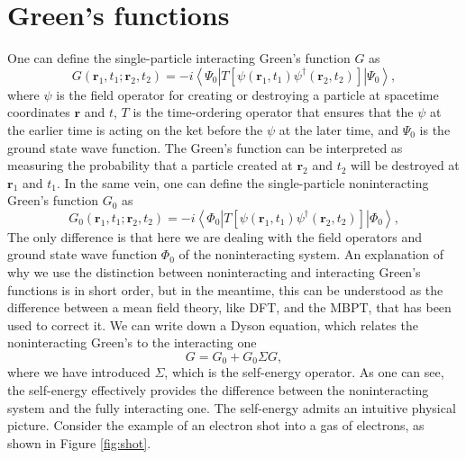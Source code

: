 \documentclass[12pt]{article}
\begin{document}
\section{Green's functions}
One can define the single-particle interacting Green's function $G$ as
\begin{equation}
G\left(\mathbf{r}_1, t_1 ; \mathbf{r}_2, t_2\right)=-i\left\langle\Psi_0\left|T\left[\psi\left(\mathbf{r}_1, t_1\right) \psi^{\dagger}\left(\mathbf{r}_2, t_2\right)\right]\right| \Psi_0\right\rangle,
\end{equation}
where $\psi$ is the field operator for creating or destroying a particle at spacetime coordinates $\mathbf{r}$ and $t$, $T$ is the time-ordering operator that ensures that the $\psi$ at the earlier time is acting on the ket before the $\psi$ at the later time, and $\Psi_0$ is the ground state wave function. The Green's function can be interpreted as measuring the probability that a particle created at $\mathbf{r}_2$ and $t_2$ will be destroyed at $\mathbf{r}_1$ and $t_1$. In the same vein, one can define the single-particle noninteracting Green's function $G_0$ as
\begin{equation}
G_0\left(\mathbf{r}_1, t_1 ; \mathbf{r}_2, t_2\right)=-i\left\langle\Phi_0\left|T\left[\psi\left(\mathbf{r}_1, t_1\right) \psi^{\dagger}\left(\mathbf{r}_2, t_2\right)\right]\right| \Phi_0\right\rangle,
\end{equation}
The only difference is that here we are dealing with the field operators and ground state wave function $\Phi_0$ of the noninteracting system. An explanation of why we use the distinction between noninteracting and interacting Green's functions is in short order, but in the meantime, this can be understood as the difference between a mean field theory, like DFT, and the MBPT, that has been used to correct it. We can write down a Dyson equation, which relates the noninteracting Green's to the interacting one
\begin{equation}
G=G_0+G_0\Sigma G,
\label{eq:dyson}
\end{equation}
where we have introduced $\Sigma$, which is the self-energy operator. As one can see, the self-energy effectively provides the difference between the noninteracting system and the fully interacting one. The self-energy admits an intuitive physical picture. Consider the example of an electron shot into a gas of electrons, as shown in Figure \ref{fig:shot}.
\end{document}
